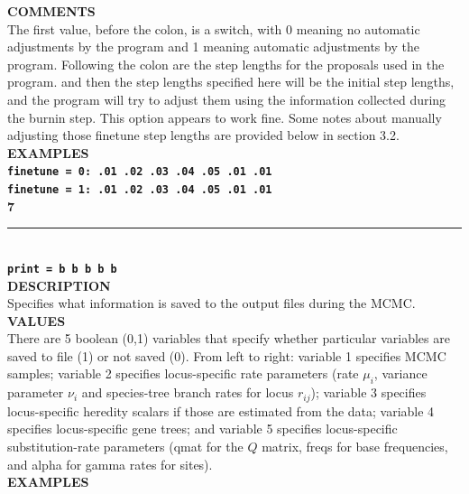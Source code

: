 \documentclass[a4paper]{book}
\numberwithin{equation}{section} \renewcommand{\baselinestretch}{0.55}
\begin{document}
\textbf{COMMENTS} \vspace{5pt}\\
The first value, before the colon, is a switch, with 0 meaning no
automatic adjustments by the program and 1 meaning automatic
adjustments by the program.  Following the colon are the step lengths
for the proposals used in the program.  and then the step lengths
specified here will be the initial step lengths, and the program will
try to adjust them using the information collected during the burnin
step.  This option appears to work fine.  Some notes about manually
adjusting those finetune step lengths are provided below in section
3.2. \vspace{5pt}\\
\textbf{EXAMPLES} \vspace{5pt}\\
\textbf{\texttt{finetune = 0: .01 .02 .03 .04 .05 .01 .01}} \vspace{5pt}\\
\textbf{\texttt{finetune = 1: .01 .02 .03 .04 .05 .01 .01}}\vspace{10pt}\\
\textbf{{\large 7}} \\
\noindent\rule{\textwidth}{0.8pt} \\
\textbf{{\Large \texttt{print = b b b b b}}} \vspace{5pt}\\
\textbf{DESCRIPTION} \vspace{5pt}\\
Specifies what information is saved to the output files during the
MCMC.
\vspace{5pt}\\
\textbf{VALUES} \vspace{5pt}\\
There are 5 boolean (0,1) variables that specify whether particular
variables are saved to file (1) or not saved (0). From left to right:
variable 1 specifies MCMC samples; variable 2 specifies locus-specific
rate parameters (rate $\mu_i$, variance parameter $\nu_i$ and
species-tree branch rates for locus $r_{ij}$); variable 3 specifies
locus-specific heredity scalars if those are estimated from the data;
variable 4 specifies locus-specific gene trees; and variable 5
specifies locus-specific substitution-rate parameters (qmat for the
$Q$ matrix, freqs for base
frequencies, and alpha for gamma rates for sites).  \vspace{5pt}\\
\textbf{EXAMPLES} \vspace{5pt}\\
\end{document}
